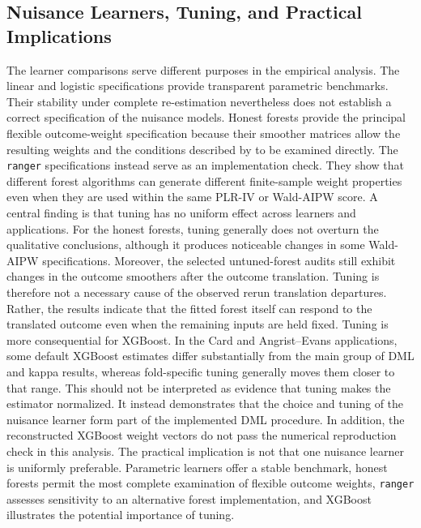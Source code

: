 \documentclass[12pt, a4paper, oneside]{article}
\theoremstyle{plain}
\theoremstyle{definition}
\begin{document}
\subsection{Nuisance Learners, Tuning, and Practical Implications}
\label{subsec:learner_implications}

The learner comparisons serve different purposes in the empirical analysis.
The linear and logistic specifications provide transparent parametric
benchmarks. Their stability under complete re-estimation nevertheless does not establish a correct specification of the nuisance models. Honest forests provide the principal flexible
outcome-weight specification because their smoother matrices allow the
resulting weights and the conditions described by
\citet{knaus2024treatment} to be examined directly. The \texttt{ranger}
specifications instead serve as an implementation check. They show that
different forest algorithms can generate different finite-sample weight
properties even when they are used within the same PLR-IV or Wald-AIPW score.
A central finding is that tuning has no uniform effect across learners and applications. For the honest
forests, tuning generally does not overturn the qualitative conclusions,
although it produces noticeable changes in some Wald-AIPW specifications.
Moreover, the selected untuned-forest audits still exhibit changes in the
outcome smoothers after the outcome translation. Tuning is therefore not a
necessary cause of the observed rerun translation departures.
Rather, the results indicate that the fitted forest itself can respond to the
translated outcome even when the remaining inputs are held fixed.
Tuning is more consequential for XGBoost. In the Card and Angrist--Evans
applications, some default XGBoost estimates differ substantially from the
main group of DML and kappa results, whereas fold-specific tuning generally
moves them closer to that range. This should not be interpreted as evidence
that tuning makes the estimator normalized. It instead demonstrates that the
choice and tuning of the nuisance learner form part of the implemented DML
procedure. In addition, the reconstructed XGBoost weight vectors do not pass
the numerical reproduction check in this analysis.
The practical implication is not that one nuisance learner is uniformly
preferable. Parametric learners offer a stable benchmark, honest forests
permit the most complete examination of flexible outcome weights,
\texttt{ranger} assesses sensitivity to an alternative forest
implementation, and XGBoost illustrates the potential importance of tuning.
\end{document}
